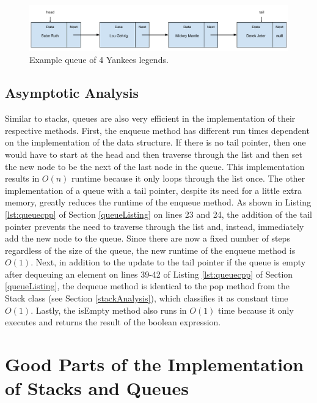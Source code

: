 \documentclass[letterpaper, 10pt,DIV=13]{scrartcl}
\numberwithin{equation}{section} %
\numberwithin{figure}{section} %
\numberwithin{table}{section} %
\begin{document}
\begin{figure}[ht] 
    \centering 
    \includegraphics[width=15cm]{queue}
    \caption{Example queue of 4 Yankees legends.}
    \label{figure:queue}
\end{figure}

\subsection{Asymptotic Analysis}\label{queueAnalysis}
Similar to stacks, queues are also very efficient in the implementation of their respective methods. First, the enqueue method has different run times dependent on the implementation of the data structure. If there is no tail pointer, then one would have to start at the head and then traverse through the list and then set the new node to be the next of the last node in the queue. This implementation results in $O(n)$ runtime because it only loops through the list once. The other implementation of a queue with a tail pointer, despite its need for a little extra memory, greatly reduces the runtime of the enqueue method. As shown in Listing \ref{lst:queuecpp} of Section \ref{queueListing} on lines 23 and 24, the addition of the tail pointer prevents the need to traverse through the list and, instead, immediately add the new node to the queue. Since there are now a fixed number of steps regardless of the size of the queue, the new runtime of the enqueue method is $O(1)$. Next, in addition to the update to the tail pointer if the queue is empty after dequeuing an element on lines 39-42 of Listing \ref{lst:queuecpp} of Section \ref{queueListing}, the dequeue method is identical to the pop method from the Stack class (see Section \ref{stackAnalysis}), which classifies it as constant time $O(1)$. Lastly, the isEmpty method also runs in $O(1)$ time because it only executes and returns the result of the boolean expression.

\section{Good Parts of the Implementation of Stacks and Queues}
\end{document}
